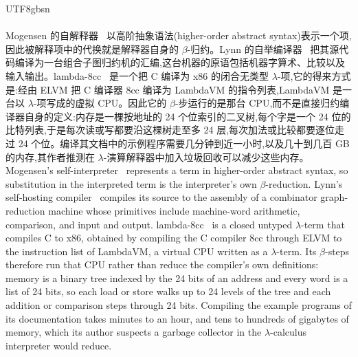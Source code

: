 \begin{CJK*}{UTF8}{gbsn}
  \paragraph{}
  \ifPaperChinese
  Mogensen 的自解释器~\cite{mogensen1992-self-interpretation} 以高阶抽象语法(higher-order abstract syntax)表示一个项,因此被解释项中的代换就是解释器自身的 $\beta$-归约。Lynn 的自举编译器~\cite{lynn-compilers-for-contrarians} 把其源代码编译为一台组合子图归约机的汇编,这台机器的原语包括机器字算术、比较以及输入输出。lambda-8cc~\cite{ikuta2022-lambda-8cc} 是一个把 C 编译为 x86 的闭合无类型 $\lambda$-项,它的得来方式是:经由 ELVM 把 C 编译器 8cc 编译为 LambdaVM 的指令列表,LambdaVM 是一台以 $\lambda$-项写成的虚拟 CPU。因此它的 $\beta$-步运行的是那台 CPU,而不是直接归约编译器自身的定义:内存是一棵按地址的 24 个位索引的二叉树,每个字是一个 24 位的比特列表,于是每次读或写都要沿这棵树走至多 24 层,每次加法或比较都要逐位走过 24 个位。编译其文档中的示例程序需要几分钟到近一小时,以及几十到几百 GB 的内存,其作者推测在 $\lambda$-演算解释器中加入垃圾回收可以减少这些内存。
  \else
  Mogensen's self-interpreter~\cite{mogensen1992-self-interpretation} represents a term in higher-order abstract syntax, so substitution in the interpreted term is the interpreter's own $\beta$-reduction. Lynn's self-hosting compiler~\cite{lynn-compilers-for-contrarians} compiles its source to the assembly of a combinator graph-reduction machine whose primitives include machine-word arithmetic, comparison, and input and output. lambda-8cc~\cite{ikuta2022-lambda-8cc} is a closed untyped $\lambda$-term that compiles C to x86, obtained by compiling the C compiler 8cc through ELVM to the instruction list of LambdaVM, a virtual CPU written as a $\lambda$-term. Its $\beta$-steps therefore run that CPU rather than reduce the compiler's own definitions: memory is a binary tree indexed by the 24 bits of an address and every word is a list of 24 bits, so each load or store walks up to 24 levels of the tree and each addition or comparison steps through 24 bits. Compiling the example programs of its documentation takes minutes to an hour, and tens to hundreds of gigabytes of memory, which its author suspects a garbage collector in the $\lambda$-calculus interpreter would reduce.
  \fi



\end{CJK*}
